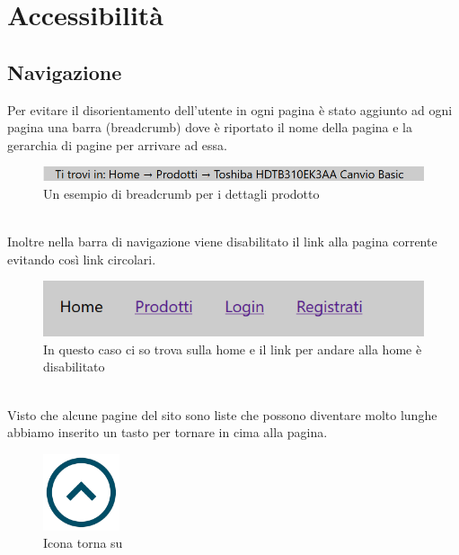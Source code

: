 \section{Accessibilità}
\subsection{Navigazione}
Per evitare il disorientamento dell'utente in ogni pagina è stato aggiunto ad ogni pagina una barra (breadcrumb) dove è riportato il nome della pagina e la gerarchia di pagine per arrivare ad essa.\newline 
\begin{figure}[h]
	\label{bc} 
	\centering %
	\includegraphics[width=1\textwidth]{immagini/bc.png}
	\caption{Un esempio di breadcrumb per i dettagli prodotto} %
\end{figure} \mbox{} \\
Inoltre nella barra di navigazione viene disabilitato  il link alla pagina corrente evitando così link circolari.
\begin{figure}[h]
	\label{navbar} 
	\centering %
	\includegraphics[width=1\textwidth]{immagini/navbar.png}
	\caption{In questo caso ci so trova sulla home e il link per andare alla home è disabilitato} %
\end{figure} \mbox{} \\
Visto che alcune pagine del sito sono liste che possono diventare molto lunghe abbiamo inserito un tasto per tornare in cima alla pagina.
\begin{figure}[h]
	\label{su} 
	\centering %
	\includegraphics[width=0.2\textwidth]{immagini/su.png}
	\caption{Icona torna su} %
\end{figure} \mbox{} \\


